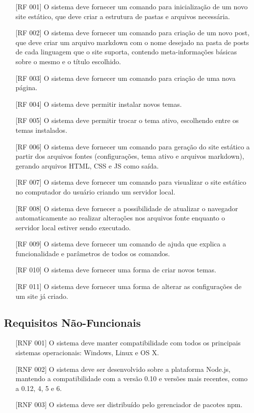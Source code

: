 \documentclass[ppginf, pep]{esinucpel}
\begin{document}
\begin{itemize}
\item [{[RF 001]}] O sistema deve fornecer um comando para inicialização de um novo site estático, que deve criar a estrutura de pastas e arquivos necessária.
\item [{[RF 002]}] O sistema deve fornecer um comando para criação de um novo post, que deve criar um arquivo markdown com o nome desejado na pasta de posts de cada linguagem que o site suporta, contendo meta-informações básicas sobre o mesmo e o título escolhido.
\item [{[RF 003]}] O sistema deve fornecer um comando para criação de uma nova página.
\item [{[RF 004]}] O sistema deve permitir instalar novos temas.
\item [{[RF 005]}] O sistema deve permitir trocar o tema ativo, escolhendo entre os temas instalados.
\item [{[RF 006]}] O sistema deve fornecer um comando para geração do site estático a partir dos arquivos fontes (configurações, tema ativo e arquivos markdown), gerando arquivos HTML, CSS e JS como saída.
\item [{[RF 007]}] O sistema deve fornecer um comando para visualizar o site estático no computador do usuário criando um servidor local.
\item [{[RF 008]}] O sistema deve fornecer a possibilidade de atualizar o navegador automaticamente ao realizar alterações nos arquivos fonte enquanto o servidor local estiver sendo executado.
\item [{[RF 009]}] O sistema deve fornecer um comando de ajuda que explica a funcionalidade e parâmetros de todos os comandos.
\item [{[RF 010]}] O sistema deve fornecer uma forma de criar novos temas.
\item [{[RF 011]}] O sistema deve fornecer uma forma de alterar as configurações de um site já criado.
\end{itemize}

\subsection{Requisitos Não-Funcionais}

\begin{itemize}
\item [{[RNF 001]}] O sistema deve manter compatibilidade com todos os principais sistemas operacionais: Windows, Linux e OS X.
\item [{[RNF 002]}] O sistema deve ser desenvolvido sobre a plataforma Node.js, mantendo a compatibilidade com a versão 0.10 e versões mais recentes, como a 0.12, 4, 5 e 6.
\item [{[RNF 003]}] O sistema deve ser distribuído pelo gerenciador de pacotes npm.
\end{itemize}
\end{document}
